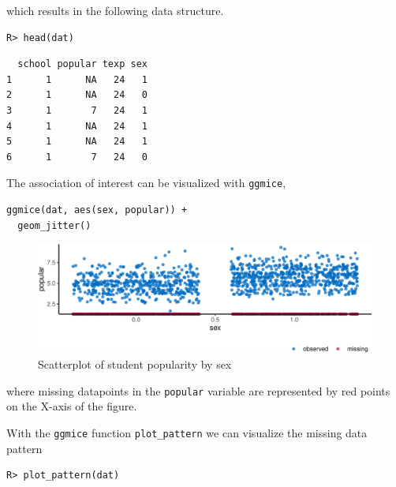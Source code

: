 \documentclass[
  article]{jss}
\begin{document}
which results in the following data structure.

\begin{verbatim}
R> head(dat)
\end{verbatim}

\begin{verbatim}
  school popular texp sex
1      1      NA   24   1
2      1      NA   24   0
3      1       7   24   1
4      1      NA   24   1
5      1      NA   24   1
6      1       7   24   0
\end{verbatim}

The association of interest can be visualized with \texttt{ggmice},

\begin{verbatim}
ggmice(dat, aes(sex, popular)) +
  geom_jitter()
\end{verbatim}

\begin{figure}[h]

{\centering \includegraphics{manuscript_files/figure-pdf/unnamed-chunk-7-1.pdf}

}

\caption{Scatterplot of student popularity by sex}

\end{figure}

where missing datapoints in the \texttt{popular} variable are
represented by red points on the X-axis of the figure.

With the \texttt{ggmice} function \texttt{plot\_pattern} we can
visualize the missing data pattern

\begin{verbatim}
R> plot_pattern(dat)
\end{verbatim}
\end{document}
